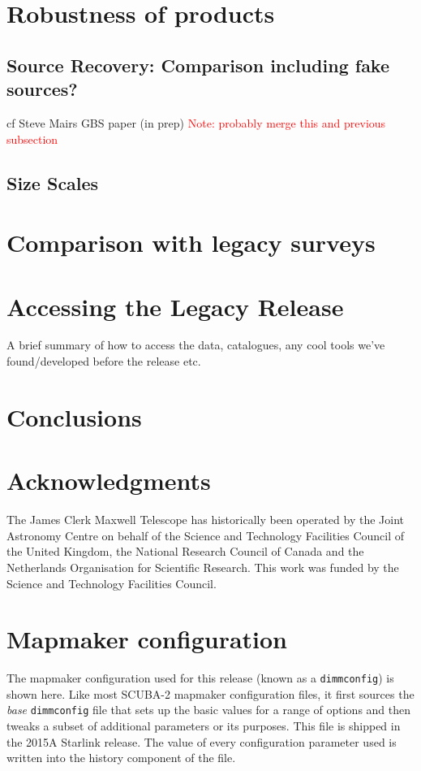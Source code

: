\documentclass[usenatbib]{mn2e}
\newcommand{\note}[1]{\textcolor{red}{Note: #1}}
\begin{document}
\section{Robustness of products}

\subsection{Source Recovery: Comparison including fake sources?}
cf Steve Mairs GBS paper (in prep)
\note{ probably merge this and previous subsection}

\subsection{Size Scales}

\section{Comparison with legacy surveys}

\section{Accessing the Legacy Release}
A brief summary of how to access the data, catalogues, any cool tools
we've found/developed before the release etc.

\section{Conclusions}

\section*{Acknowledgments}

The James Clerk Maxwell Telescope has historically been operated by
the Joint Astronomy Centre on behalf of the Science and Technology
Facilities Council of the United Kingdom, the National Research
Council of Canada and the Netherlands Organisation for Scientific
Research. This work was funded by the Science and Technology Facilities
Council.




\appendix
\onecolumn

\section{Mapmaker configuration}
The mapmaker configuration used for this release (known as a
\texttt{dimmconfig}) is shown here. Like most SCUBA-2 mapmaker
configuration files, it first sources the \emph{base}
\texttt{dimmconfig} file that sets up the basic values for a range of
options and then tweaks a subset of additional parameters or its
purposes. This file is shipped in the 2015A Starlink release. The
value of every configuration parameter used is written into the
history component of the file.
\end{document}
